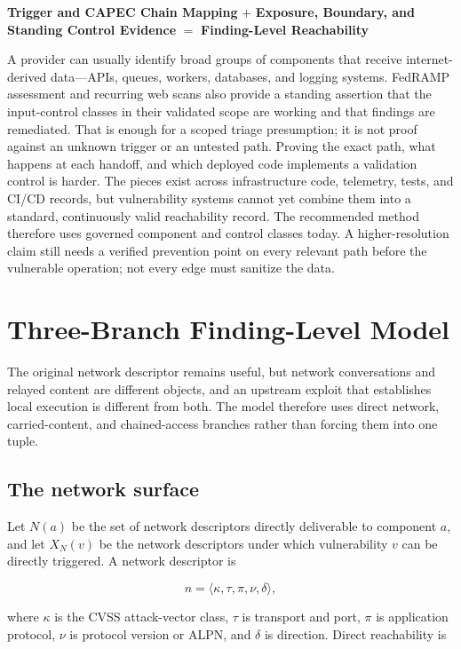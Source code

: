 \documentclass[11pt]{article}
\begin{document}
\begin{keybox}
\centering
\textbf{Trigger and CAPEC Chain Mapping}
\quad$+$\quad
\textbf{Exposure, Boundary, and Standing Control Evidence}
\quad$=$\quad
\textbf{Finding-Level Reachability}
\end{keybox}

\begin{plain}
A provider can usually identify broad groups of components that receive
internet-derived data---APIs, queues, workers, databases, and logging systems.
FedRAMP assessment and recurring web scans also provide a standing assertion
that the input-control classes in their validated scope are working and that
findings are remediated. That is enough for a scoped triage presumption; it is
not proof against an unknown trigger or an untested path. Proving the exact
path, what happens at each handoff, and which deployed code implements a
validation control is harder. The pieces exist across
infrastructure code, telemetry, tests, and CI/CD records, but vulnerability
systems cannot yet combine them into a standard, continuously valid
reachability record. The recommended method therefore uses governed component
and control classes today. A higher-resolution claim still needs a verified
prevention point on every relevant path before the vulnerable operation; not
every edge must sanitize the data.
\end{plain}

\section{Three-Branch Finding-Level Model}
\label{sec:model}
The original network descriptor remains useful, but network conversations and
relayed content are different objects, and an upstream exploit that establishes
local execution is different from both. The model therefore uses direct
network, carried-content, and chained-access branches rather than forcing them
into one tuple.

\subsection{The network surface}
Let $N(a)$ be the set of network descriptors directly deliverable to component
$a$, and let $X_N(v)$ be the network descriptors under which vulnerability $v$
can be directly triggered. A network descriptor is

\[
n=\langle\kappa,\tau,\pi,\nu,\delta\rangle,
\]

where $\kappa$ is the CVSS attack-vector class, $\tau$ is transport and port,
$\pi$ is application protocol, $\nu$ is protocol version or ALPN, and $\delta$
is direction. Direct reachability is
\end{document}
